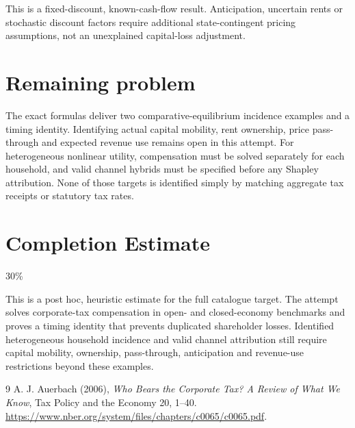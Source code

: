 \documentclass[11pt]{article}
\theoremstyle{definition}
\begin{document}
This is a fixed-discount, known-cash-flow result. Anticipation, uncertain
rents or stochastic discount factors require additional state-contingent
pricing assumptions, not an unexplained capital-loss adjustment.

\section*{Remaining problem}
The exact formulas deliver two comparative-equilibrium incidence examples
and a timing identity. Identifying actual capital mobility, rent ownership,
price pass-through and expected revenue use remains open in this attempt.
For heterogeneous nonlinear utility, compensation must be solved separately
for each household, and valid channel hybrids must be specified before any
Shapley attribution. None of those targets is identified simply by matching
aggregate tax receipts or statutory tax rates.

\section{Completion Estimate}
30\%

This is a post hoc, heuristic estimate for the full catalogue target.
The attempt solves corporate-tax compensation in open- and closed-economy benchmarks and proves a timing identity that prevents duplicated shareholder losses. Identified heterogeneous household incidence and valid channel attribution still require capital mobility, ownership, pass-through, anticipation and revenue-use restrictions beyond these examples.

\begin{thebibliography}{9}
 A. J. Auerbach (2006), \emph{Who Bears the Corporate Tax?
A Review of What We Know}, Tax Policy and the Economy 20, 1--40.
\url{https://www.nber.org/system/files/chapters/c0065/c0065.pdf}.
\end{thebibliography}
\end{document}
